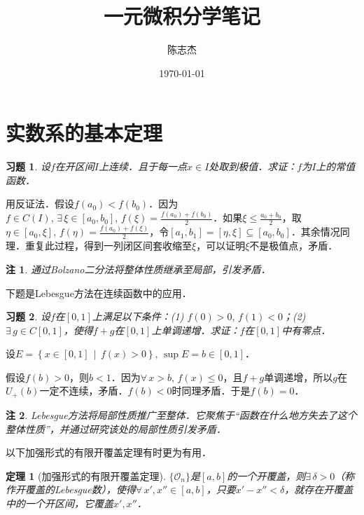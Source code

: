 \documentclass[11pt,a4paper]{ctexart}
\title{一元微积分学笔记}
\author{陈志杰}
\date{\today}
\makeatletter
\theoremstyle{thmseries} %
\newtheorem{thm}{定理}[section]
\theoremstyle{exerseries}
\newtheorem{exer}{习题}[section]
\newtheorem*{rem}{注}
\renewenvironment{proof}[1][\proofname]{\par
  \pushQED{\qed}%
  \normalfont \topsep6\p@\@plus6\p@\relax
  \trivlist
  \item[\hskip\labelsep
        \itshape
    #1\@addpunct{}]\ignorespaces
}{%
  \popQED\endtrivlist\@endpefalse
}
\newenvironment{pf}{\begin{proof}[\bfseries\upshape 证\quad]}{\end{proof}}
\newcommand{\cbra}[1]{\mathopen{}\left\{#1\right\}}
\makeatother
\begin{document}
\maketitle
\thispagestyle{empty}
\tableofcontents
\justifying
\newpage


\section{实数系的基本定理}
\begin{exer}
	设$f$在开区间$I$上连续．且于每一点$x\in I$处取到极值．求证：$f$为$I$上的常值函数．
\end{exer}
\begin{pf}
	用反证法．假设$f(a_0)<f(b_0)$．因为$f\in C(I),\,\exists\,\xi\in[a_0,b_0],\,f(\xi)=\frac{f(a_0)+f(b_0)}{2}$．如果$\xi\leq\frac{a_0+b_0}{2}$，取$\eta\in[a_0,\xi],\,f(\eta)=\frac{f(a_0)+f(\xi)}{2}$，令$[a_1,b_1]=[\eta,\xi]\subseteq[a_0,b_0]$．其余情况同理．重复此过程，得到一列闭区间套收缩至$\xi$，可以证明$\xi$不是极值点，矛盾．
\end{pf}
\begin{rem}
	通过Bolzano二分法将整体性质继承至局部，引发矛盾．
\end{rem}

下题是Lebesgue方法在连续函数中的应用．
\begin{exer}
	设$f$在$[0,1]$上满足以下条件：(1) $f(0)>0,\,f(1)<0$；(2) $\exists\,g\in C[0,1]$，使得$f+g$在$[0,1]$上单调递增．求证：$f$在$[0,1]$中有零点．
\end{exer}
\begin{pf}
	设$E=\cbra{x\in[0,1]\,\middle\vert\,f(x)>0},\,\sup E=b\in[0,1]$．
	
	假设$f(b)>0$，则$b<1$．因为$\forall\,x>b,\,f(x)\leq0$，且$f+g$单调递增，所以$g$在$U_+(b)$一定不连续，矛盾．$f(b)<0$时同理矛盾．于是$f(b)=0$．
\end{pf}
\begin{rem}
	Lebesgue方法将局部性质推广至整体．它聚焦于``函数在什么地方失去了这个整体性质''，并通过研究该处的局部性质引发矛盾．
\end{rem}

以下加强形式的有限开覆盖定理有时更为有用．
\begin{thm}[加强形式的有限开覆盖定理]
	$\{\mathcal{O}_n\}$是$[a,b]$的一个开覆盖，则$\exists\,\delta>0$（称作开覆盖的Lebesgue数），使得$\forall\,x',x''\in[a,b]$，只要$x'-x''<\delta$，就存在开覆盖中的一个开区间，它覆盖$x',x''$．
\end{thm}
\end{document}
